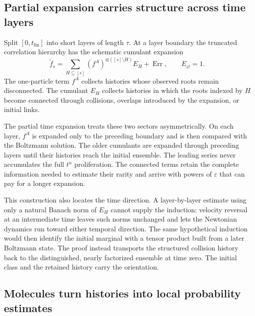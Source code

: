 \subsection{Partial expansion carries structure across time layers}

Split $[0,t_{\mathrm{fin}}]$ into short layers of length $\tau$.  At a layer boundary the truncated
correlation hierarchy has the schematic cumulant expansion
\begin{equation}
\widetilde f_s
=\sum_{H\subseteq[s]}
  (f^A)^{\otimes([s]\setminus H)}E_H
+\operatorname{Err},
\qquad E_\varnothing=1.
\label{eq:book-hard-sphere-cumulant-expansion}
\end{equation}
The one-particle term $f^A$ collects histories whose observed roots remain disconnected.  The
cumulant $E_H$ collects histories in which the roots indexed by $H$ become connected through
collisions, overlaps introduced by the expansion, or initial links.

The partial time expansion treats these two sectors asymmetrically.  On each layer, $f^A$ is
expanded only to the preceding boundary and is then compared with the Boltzmann solution.  The
older cumulants are expanded through preceding layers until their histories reach the initial
ensemble.  The leading series never accumulates the full $t^n$ proliferation.  The connected terms
retain the complete information needed to estimate their rarity and arrive with powers of
$\varepsilon$ that can pay for a longer expansion.

This construction also locates the time direction.  A layer-by-layer estimate using only a natural
Banach norm of $E_H$ cannot supply the induction: velocity reversal at an intermediate time leaves
such norms unchanged and lets the Newtonian dynamics run toward either temporal direction.  The
same hypothetical induction would then identify the initial marginal with a tensor product built
from a later Boltzmann state.  The proof instead transports the structured collision history back
to the distinguished, nearly factorized ensemble at time zero.  The initial class and the retained
history carry the orientation.

\subsection{Molecules turn histories into local probability estimates}

